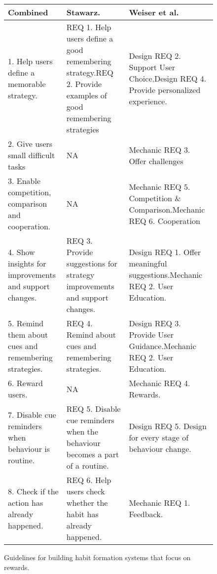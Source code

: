 \begin{landscape}
\renewcommand{\arraystretch}{1.5} %
\begin{figure}[ht] %


\begin{center}
\begin{tabular}{ |p{7cm}|p{6cm}|p{6.5cm}| }
  \hline
  \textbf{Combined} & \textbf{Stawarz.~\cite{thesis_kathy}} & \textbf{Weiser et al.~\cite{article_taxonomy_motivational_affordances_meaningful}} \\ \hline %
  1. Help users define a memorable strategy. & REQ 1. Help users define a good remembering strategy.\newline REQ 2. Provide examples of good remembering strategies & Design REQ 2. Support User Choice.\newline Design REQ 4. Provide personalized experience. \\ \hline
  2. Give users small difficult tasks & N\/A & Mechanic REQ 3. Offer challenges\\ \hline
  3. Enable competition, comparison and cooperation. & N\/A & Mechanic REQ 5. Competition \& Comparison.\newline Mechanic REQ 6. Cooperation\\ \hline
  4. Show insights for improvements and support changes. & REQ 3. Provide suggestions for strategy improvements and support changes. & Design REQ 1. Offer meaningful suggestions.\newline Mechanic REQ 2. User Education. \\ \hline
  5. Remind them about cues and remembering strategies. & REQ 4. Remind about cues and remembering strategies. & Design REQ 3. Provide User Guidance.\newline Mechanic REQ 2. User Education. \\ \hline
  6. Reward users. & N\/A & Mechanic REQ 4. Rewards. \\ \hline
  7. Disable cue reminders when behaviour is routine. & REQ 5. Disable cue reminders when the behaviour becomes a part of a routine. & Design REQ 5. Design for every stage of behaviour change. \\ \hline
  8. Check if the action has already happened. & REQ 6. Help users check whether the habit has already happened. & Mechanic REQ 1. Feedback. \\ \hline
\end{tabular}
\end{center}

    \caption{Guidelines for building habit formation systems that focus on rewards.}
    \label{fig:reqtable}
\end{figure}
\newpage
\end{landscape}
